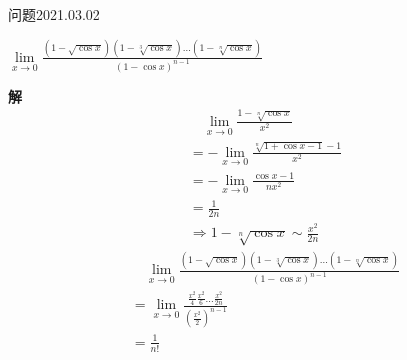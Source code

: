 \begin{mybox}{问题2021.03.02}
	
	\qquad $\lim\limits_{x \to 0} \frac{(1-\sqrt{\cos x})(1-\sqrt[3]{\cos x})\dots (1-\sqrt[n]{\cos x})}{(1-\cos x)^{n-1}}$
\end{mybox}
\noindent
\textbf{解}
\begin{align*}
	&\quad \lim\limits_{x\to 0} \frac{1-\sqrt[n]{\cos x}}{x^2}\\
	&=-\lim\limits_{x\to 0} \frac{\sqrt[n]{1+\cos x -1}-1}{x^2}\\
	&=-\lim\limits_{x\to 0} \frac{\cos x -1}{nx^2}\\
	&=\frac{1}{2n}\\
	&\Rightarrow 1-\sqrt[n]{\cos x} \sim \frac{x^2}{2n}
\end{align*}
\begin{align*}
	&\quad\lim\limits_{x \to 0} \frac{(1-\sqrt{\cos x})(1-\sqrt[3]{\cos x})\dots (1-\sqrt[n]{\cos x})}{(1-\cos x)^{n-1}}\\
	&=\lim\limits_{x \to 0} \frac{\frac{x^2}{4} \frac{x^2}{6}\dots \frac{x^2}{2n}}{(\frac{x^2}{2})^{n-1}}\\
	&=\frac{1}{n!}
\end{align*}